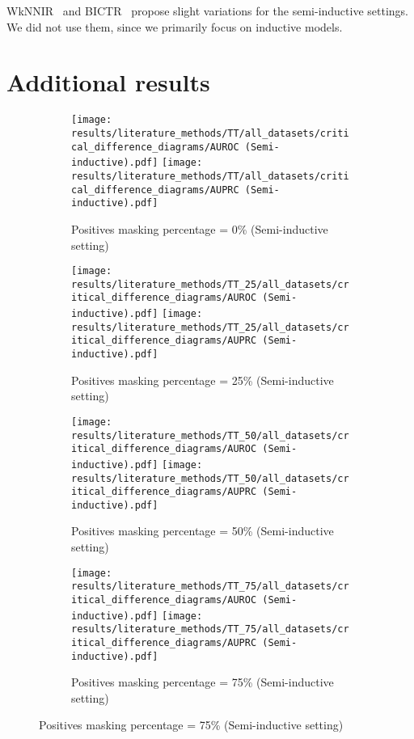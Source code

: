 \documentclass[sn-mathphys-num]{sn-jnl}%
\theoremstyle{thmstyleone}%
\theoremstyle{thmstyletwo}%
\theoremstyle{thmstylethree}%
\begin{document}
\begin{appendices}
WkNNIR~\cite{liu_drug-target_2022} and BICTR~\cite{pliakos_global_2018} propose slight variations for the semi-inductive settings. We did not use them, since we primarily focus on inductive models.



\section{Additional results}
\label{sec:additional results}
\FloatBarrier

\begin{figure}[tbh]
    \centering
    \begin{subfigure}{\textwidth}
        \texttt{[image: results/literature\_methods/TT/all\_datasets/critical\_difference\_diagrams/AUROC (Semi-inductive).pdf]}
        \hfill
        \texttt{[image: results/literature\_methods/TT/all\_datasets/critical\_difference\_diagrams/AUPRC (Semi-inductive).pdf]}
        \caption{Positives masking percentage = 0\% (Semi-inductive setting)}
    \end{subfigure}
    
    \begin{subfigure}{\textwidth}
        \texttt{[image: results/literature\_methods/TT\_25/all\_datasets/critical\_difference\_diagrams/AUROC (Semi-inductive).pdf]}
        \hfill
        \texttt{[image: results/literature\_methods/TT\_25/all\_datasets/critical\_difference\_diagrams/AUPRC (Semi-inductive).pdf]}
        \caption{Positives masking percentage = 25\% (Semi-inductive setting)}
    \end{subfigure}
    
    \begin{subfigure}{\textwidth}
        \texttt{[image: results/literature\_methods/TT\_50/all\_datasets/critical\_difference\_diagrams/AUROC (Semi-inductive).pdf]}
        \hfill
        \texttt{[image: results/literature\_methods/TT\_50/all\_datasets/critical\_difference\_diagrams/AUPRC (Semi-inductive).pdf]}
        \caption{Positives masking percentage = 50\% (Semi-inductive setting)}
    \end{subfigure}
    
    \begin{subfigure}{\textwidth}
        \texttt{[image: results/literature\_methods/TT\_75/all\_datasets/critical\_difference\_diagrams/AUROC (Semi-inductive).pdf]}
        \hfill
        \texttt{[image: results/literature\_methods/TT\_75/all\_datasets/critical\_difference\_diagrams/AUPRC (Semi-inductive).pdf]}
        \caption{Positives masking percentage = 75\% (Semi-inductive setting)}
    \end{subfigure}   


\end{figure}
\end{appendices}
\end{document}
